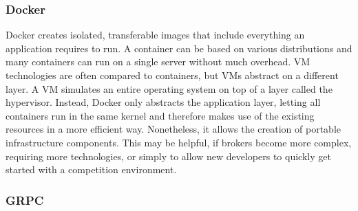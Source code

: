 
\subsubsection{Docker}
\label{sub:docker}

Docker creates isolated, transferable images that include everything an application requires to run. A
container can be based on various distributions and many containers can run on a single server without much overhead.
\ac{VM} technologies are often compared to containers, but \ac{VM}s abstract on a different layer. A \ac{VM} simulates
an entire operating system on top of a layer called the hypervisor. Instead, Docker only abstracts the
application layer, letting all containers run in the same kernel and therefore makes use of the existing resources in a
more efficient way. Nonetheless, it allows the creation of portable infrastructure components. This may be helpful, if
brokers become more complex, requiring more technologies, or simply to allow new developers to quickly get started with
a competition environment.

\subsubsection{\acl{GRPC}}%
\label{sub:grpc}

